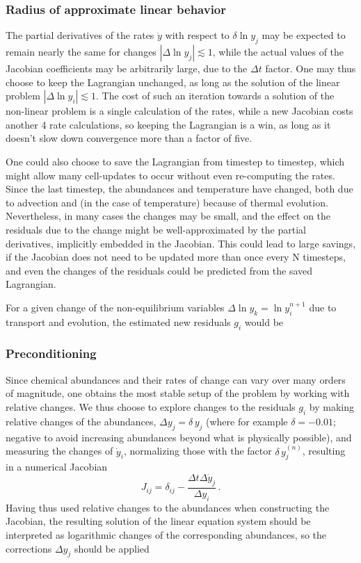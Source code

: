 \documentclass[paper=a4,fontsize=11pt]{scrartcl}
\numberwithin{equation}{section}		%
\numberwithin{figure}{section}			%
\numberwithin{table}{section}				%
\begin{document}
\subsubsection{Radius of approximate linear behavior}
The partial derivatives of the rates $\dot{y}$ with respect to $\delta\ln y_j$ may be expected to remain nearly the same for changes $|\Delta\ln y_j| \lesssim 1$, while the actual values of the Jacobian coefficients may be arbitrarily large, due to the $\Delta t$ factor.   One may thus choose to keep the Lagrangian unchanged, as long as the solution of the linear problem $|\Delta\ln y_i| \lesssim 1$.  The cost of such an iteration towards a solution of the non-linear problem is a single calculation of the rates, while a new Jacobian costs another 4 rate calculations, so keeping the Lagrangian is a win, as long as it doesn't slow down convergence more than a factor of five.

One could also choose to save the Lagrangian from timestep to timestep, which might allow many cell-updates to occur without even re-computing the rates.  Since the last timestep, the abundances and temperature have changed, both due to advection and (in the case of temperature) because of thermal evolution.  Nevertheless, in many cases the changes may be small, and the effect on the residuals due to the change might be well-approximated by the partial derivatives, implicitly embedded in the Jacobian.  This could lead to large savings, if the Jacobian does not need to be updated more than once every N timesteps, and even the changes of the residuals could be predicted from the saved Lagrangian.

For a given change of the non-equilibrium variables $\Delta \ln y_k = \ln y_i^{n+1}$ due to transport and evolution, the estimated new residuals $g_i$ would be 

\subsubsection{Preconditioning}
Since chemical abundances and their rates of change can vary over many orders of magnitude, one obtains the most stable setup of the problem by working with  relative changes.  We thus choose to explore changes to the residuals $g_i$ by making relative changes of the abundances, $\Delta y_j= \delta\, y_j$ (where for example $\delta=-0.01$; negative to avoid increasing abundances beyond what is physically possible), and measuring the changes of $\dot{y}_i$, normalizing those with the factor $\delta\,y_j^{(n)}$, resulting in a numerical Jacobian
\begin{equation}
    J_{ij} = \delta_{ij} - \frac{\Delta t \Delta \dot{y}_j}{\Delta y_i} \,.
\end{equation}
Having thus used relative changes to the abundances when constructing the Jacobian, the resulting solution of the linear equation system should be interpreted as logarithmic changes of the corresponding abundances, so the corrections $\Delta y_j$ should be applied 
\end{document}
